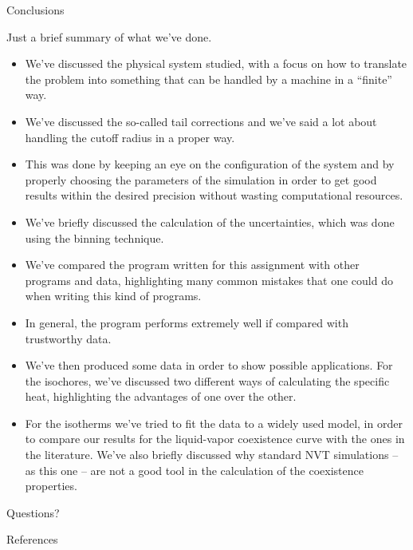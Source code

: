 \documentclass[10pt, compress, protectframetitle, handout]{beamer}
\begin{document}
\begin{frame}[allowframebreaks]{Conclusions}

	Just a brief summary of what we've done.

	\begin{itemize}
		\item We've discussed the physical system studied, with a focus on how to translate the problem into something that can be handled by a machine in a ``finite'' way.
		\item We've discussed the so-called \alert{tail corrections} and we've said a lot about handling the \alert{cutoff radius} in a proper way.
		\item This was done by keeping an eye on the configuration of the system and by properly choosing the parameters of the simulation in order to get good results within the desired precision without wasting computational resources.
		\item We've briefly discussed the calculation of the uncertainties, which was done using the \alert{binning technique}.
		\item We've compared the program written for this assignment with other programs and data, highlighting many common mistakes that one could do when writing this kind of programs.
		\item In general, the program performs extremely well if compared with trustworthy data.
		\item We've then produced some data in order to show possible applications. For the isochores, we've discussed two different ways of calculating the \alert{specific heat}, highlighting the advantages of one over the other.
		\item For the isotherms we've tried to fit the data to a widely used model, in order to compare our results for the liquid-vapor \alert{coexistence curve} with the ones in the literature. We've also briefly discussed why standard NVT simulations -- as this one -- are not a good tool in the calculation of the coexistence properties.
	\end{itemize}

	
	\begin{center}
		\Large {}
		
		\Huge\uncover<+->{\Smiley}
	\end{center}

\end{frame}

\begin{frame}[standout]
	Questions?
\end{frame}

\begin{frame}[allowframebreaks]{References}

	\nocite{*}
	
	

\end{frame}
\end{document}
